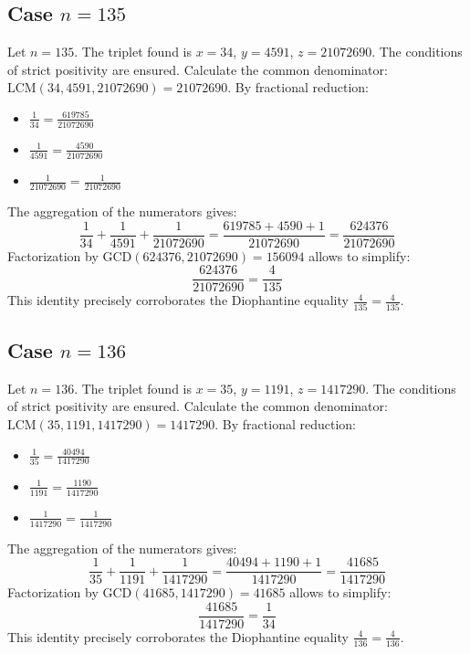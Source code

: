 \documentclass[11pt,a4paper]{article}
\begin{document}
\subsection{Case $n = 135$}
Let $n = 135$. The triplet found is $x = 34$, $y = 4591$, $z = 21072690$.
The conditions of strict positivity are ensured.
Calculate the common denominator: $\text{LCM}(34, 4591, 21072690) = 21072690$.
By fractional reduction:
\begin{itemize}
    \item $\frac{1}{34} = \frac{619785}{21072690}$
    \item $\frac{1}{4591} = \frac{4590}{21072690}$
    \item $\frac{1}{21072690} = \frac{1}{21072690}$
\end{itemize}
The aggregation of the numerators gives:
$$ \frac{1}{34} + \frac{1}{4591} + \frac{1}{21072690} = \frac{619785 + 4590 + 1}{21072690} = \frac{624376}{21072690} $$
Factorization by $\text{GCD}(624376, 21072690) = 156094$ allows to simplify:
$$ \frac{624376}{21072690} = \frac{4}{135} $$
This identity precisely corroborates the Diophantine equality $\frac{4}{135} = \frac{4}{135}$.

\subsection{Case $n = 136$}
Let $n = 136$. The triplet found is $x = 35$, $y = 1191$, $z = 1417290$.
The conditions of strict positivity are ensured.
Calculate the common denominator: $\text{LCM}(35, 1191, 1417290) = 1417290$.
By fractional reduction:
\begin{itemize}
    \item $\frac{1}{35} = \frac{40494}{1417290}$
    \item $\frac{1}{1191} = \frac{1190}{1417290}$
    \item $\frac{1}{1417290} = \frac{1}{1417290}$
\end{itemize}
The aggregation of the numerators gives:
$$ \frac{1}{35} + \frac{1}{1191} + \frac{1}{1417290} = \frac{40494 + 1190 + 1}{1417290} = \frac{41685}{1417290} $$
Factorization by $\text{GCD}(41685, 1417290) = 41685$ allows to simplify:
$$ \frac{41685}{1417290} = \frac{1}{34} $$
This identity precisely corroborates the Diophantine equality $\frac{4}{136} = \frac{4}{136}$.
\end{document}
